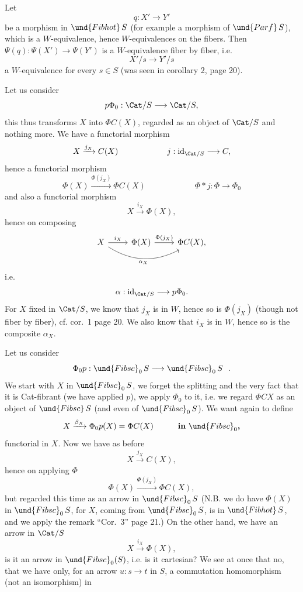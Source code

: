 Let
\[ q : X' \longrightarrow Y' \]
be a morphism in $\und{Fibhot}\,S$ (for example a morphism of $\und{Parf}\,S$), which is a $W$-equivalence, hence $W$-equivalences on the fibers. Then $\Psi(q) : \Psi(X') \longrightarrow \Psi(Y')$ is a $W$-equivalence fiber by fiber, i.e.
\[ X'/s \longrightarrow Y'/s \]
a $W$-equivalence for every $s \in S$ (was seen in corollary 2, page 20).

Let us consider
\[ p\Phi_0 : \Cat/S \longrightarrow \Cat/S, \]
this thus transforms $X$ into $\Phi C(X)$, regarded as an object of $\Cat/S$ and nothing more. We have a functorial morphism
\[ X \xrightarrow{j_X} C(X) \qquad\qquad\qquad j : \mathrm{id}_{\Cat/S} \longrightarrow C, \]
hence a functorial morphism
\[ \Phi(X) \xrightarrow{\Phi(j_X)} \Phi C(X) \qquad\qquad\qquad \Phi * j : \Phi \longrightarrow \Phi_0 \]
and also a functorial morphism
\[ X \xrightarrow{i_X} \Phi(X), \]
hence on composing
\[
\begin{tikzcd}
X \arrow[r, "i_X"] \arrow[rr, bend right, "\alpha_X"'] & \Phi(X) \arrow[r, "\Phi(j_X)"] & \Phi C(X),
\end{tikzcd}
\]
i.e.
\[ \alpha : \mathrm{id}_{\Cat/S} \longrightarrow p\Phi_0. \]
For $X$ fixed in $\Cat/S$, we know that $j_X$ is in $W$, hence so is $\Phi(j_X)$ (though not fiber by fiber), cf. cor.~1 page 20. We also know that $i_X$ is in $W$, hence so is the composite $\alpha_X$.

Let us consider
\[ \Phi_0 p : \und{Fibsc}_0\,S \longrightarrow \und{Fibsc}_0\,S\ \ . \]
We start with $X$ in $\und{Fibsc}_0\,S$, we forget the splitting and the very fact that it is Cat-fibrant
(we have applied $p$), we apply $\Phi_0$ to it, i.e. we regard $\Phi CX$ as an object of $\und{Fibsc}\,S$ (and even of $\und{Fibsc}_0\,S$). We want again to define
\[ X \xrightarrow{\beta_X} \Phi_0 p(X) = \Phi C(X) \qquad\quad \text{\textbf{in} } \und{Fibsc}_0\text{\textbf{,}} \] %
functorial in $X$. Now we have as before
\[ X \xrightarrow{j_X} C(X), \]
hence on applying $\Phi$
\[ \Phi(X) \xrightarrow{\Phi(j_X)} \Phi C(X), \]
but regarded this time as an arrow in $\und{Fibsc}_0\,S$ (N.B. we do have $\Phi(X)$ in $\und{Fibsc}_0\,S$, for $X$, coming from $\und{Fibsc}_0\,S$, is in $\und{Fibhot}\,S$, and we apply the remark ``Cor.~3'' page 21.) On the other hand, we have an arrow in $\Cat/S$
\[ X \xrightarrow{i_X} \Phi(X), \]
is it an arrow in $\und{Fibsc}_0(S)$, i.e. is it cartesian? We see at once that no, that we have only, for an arrow $u : s \longrightarrow t$ in $S$, a commutation homomorphism (not an isomorphism) in